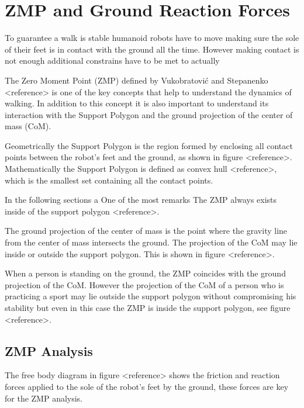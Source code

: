 \documentclass[a4paper]{report}
\begin{document}
\section{ZMP and Ground Reaction Forces}
To guarantee a walk is stable humanoid robots have to move making sure the sole
of their feet is in contact with the ground all the time. However making contact
is not enough additional constrains have to be met to actually

The Zero Moment Point (ZMP) defined by Vukobratovi\'{c} and Stepanenko <reference>
is one of the key concepts that help to understand the dynamics of walking.
In addition to this concept it is also important to understand its interaction
with the Support Polygon and the ground projection of the center of mass (CoM).

Geometrically the Support Polygon is the region formed by enclosing all contact
points between the robot's feet and the ground, as shown in figure <reference>.
Mathematically the Support Polygon is defined as convex hull <reference>, which
is the smallest set containing all the contact points.

In the following sections a One of the most remarks
The ZMP always exists inside of the support polygon <reference>.

The ground projection of the center of mass is the point where the gravity line
from the center of mass intersects the ground. The projection of the CoM may lie
inside or outside the support polygon. This is shown in figure <reference>.

When a person is standing on the ground, the ZMP coincides with the ground projection
of the CoM. However the projection of the CoM of a person who is practicing a
sport may lie outside the support polygon without compromising his stability but
even in this case the ZMP is inside the support polygon, see figure <reference>.

\subsection{ZMP Analysis}
The free body diagram in figure <reference> shows the friction and reaction forces
applied to the sole of the robot's feet by the ground, these forces are key for
the ZMP analysis.
\end{document}
